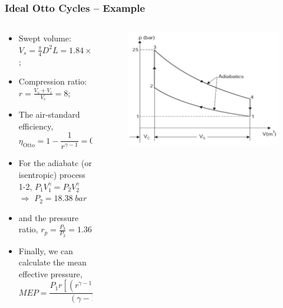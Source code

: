 \documentclass[10pt,compress]{beamer}
\begin{document}
\begin{frame}
 \frametitle{Ideal Otto Cycles --  Example}
  \begin{columns}
   \begin{column}[c]{0.6\linewidth}
    \begin{itemize}
     \item <1-> Swept volume: $V_{s}=\displaystyle\frac{\pi}{4}D^{2}L=1.84\times 10^{-2}\;m^{3}$;
     \item <2-> Compression ratio: $r=\displaystyle\frac{V_{s}+V_{c}}{V_{c}}=8$;
     \item <3-> The air-standard efficiency,
      \begin{displaymath}
       \eta_{\text{Otto}} = 1 - \displaystyle\frac{1}{r^{\gamma-1}}=0.565
      \end{displaymath}
     \item <4-> For the adiabatc (or isentropic) process 1-2, $P_{1}V_{1}^{\gamma}=P_{2}V_{2}^{\gamma}$ $\Rightarrow$ $P_{2}=18.38\;bar$
     \item <5-> and the pressure ratio, $r_{p}=\displaystyle\frac{P_{3}}{P_{2}}=1.36$
     \item <6-> Finally, we can calculate the mean effective pressure,
       \begin{displaymath}
        MEP = \displaystyle\frac{P_{1}r\left[\left(r^{\gamma-1} - 1\right)\left(r_{p}-1\right)\right]} {\left(\gamma-1\right)\left(r-1\right)} = 1.334\;bar
       \end{displaymath}
    \end{itemize}
   \end{column}
   \begin{column}[c]{0.4\linewidth}
    \begin{figure}%
     \begin{center}
      \includegraphics[width=5.cm,clip]{./Pics/InternalCombustion_IdealOttoCycle_Example1}
     \end{center}
    \end{figure}   
   \end{column}  
  \end{columns}
\end{frame}
\end{document}
